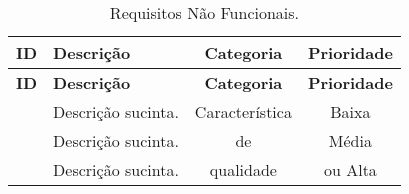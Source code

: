 \begin{longtable}{|c|p{8.3cm}|c|c|}
	\caption{Requisitos Não Funcionais.}
	\label{tbl-requisitos-rnfs} \\\hline 
	
	\rowcolor{lightgray}
	\textbf{ID} & \textbf{Descrição} & \textbf{Categoria} & \textbf{Prioridade} \\\hline		
	\endfirsthead
	\hline
	\rowcolor{lightgray}
	\textbf{ID} & \textbf{Descrição} & \textbf{Categoria} & \textbf{Prioridade} \\\hline		
	\endhead
	
	\RNF\label{rnf-exemplo-01} & Descrição sucinta. & Característica & Baixa \\\hline 	

	\RNF\label{rnf-exemplo-02} & Descrição sucinta. & de & Média \\\hline 	

	\RNF\label{rnf-exemplo-03} & Descrição sucinta. & qualidade & ou Alta \\\hline
\end{longtable}


